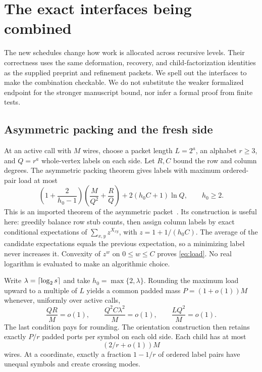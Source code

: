 \section{The exact interfaces being combined}\label{sec:interfaces}
The new schedules change how work is allocated across recursive levels.
Their correctness uses the same deformation, recovery, and child-factorization
identities as the supplied preprint and refinement packets. We spell out the
interfaces to make the combination checkable. We do not substitute the
weaker formalized endpoint for the stronger manuscript bound, nor infer a
formal proof from finite tests.

\subsection{Asymmetric packing and the fresh side}
At an active call with $M$ wires, choose a packet length $L=2^a$, an alphabet
$r\ge3$, and $Q=r^a$ whole-vertex labels on each side. Let $R,C$ bound the
row and column degrees. The asymmetric packing theorem gives labels with
maximum ordered-pair load at most
\begin{equation}\label{eq:load}
 \left(1+\frac{2}{h_0-1}\right)
 \left(\frac{M}{Q^2}+\frac{R}{Q}\right)
 +2(h_0C+1)\ln Q,
 \qquad h_0\ge2.
\end{equation}
This is an imported theorem of the asymmetric packet~\cite{asymmetric}.
Its construction is useful here: greedily balance row stub counts, then
assign column labels by exact conditional expectations of
$\sum_{x,y}z^{X_{xy}}$, with $z=1+1/(h_0C)$. The average of the candidate
expectations equals the previous expectation, so a minimizing label never
increases it. Convexity of $z^w$ on $0\le w\le C$ proves
\eqref{eq:load}. No real logarithm is evaluated to make an algorithmic choice.

Write $\lambda=\left\lceil\log_2s\right\rceil$ and take $h_0=\max\{2,\lambda\}$.
Rounding the maximum load upward to a multiple of $L$ yields a common padded
mass $P=(1+o(1))M$ whenever, uniformly over active calls,
\begin{equation}\label{eq:packing-conditions}
 \frac{QR}{M}=o(1),\qquad
 \frac{Q^2C\lambda^2}{M}=o(1),\qquad
 \frac{LQ^2}{M}=o(1).
\end{equation}
The last condition pays for rounding. The orientation construction then
retains exactly $P/r$ padded ports per symbol on each old side. Each child
has at most
\begin{equation}\label{eq:child}
 (2/r+o(1))M
\end{equation}
wires. At a coordinate, exactly a fraction $1-1/r$ of ordered label pairs
have unequal symbols and create crossing modes.

